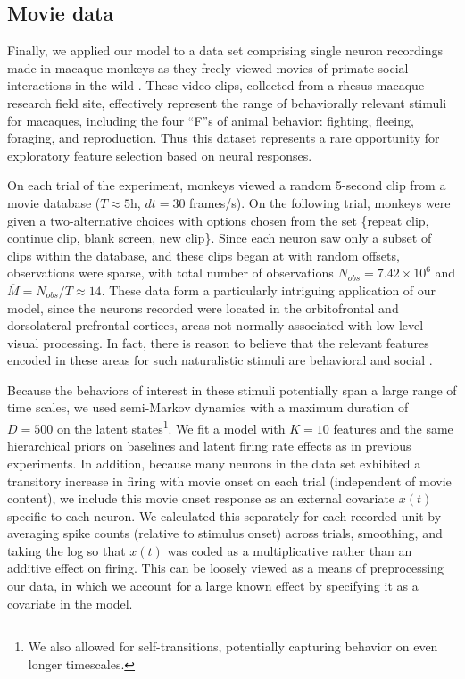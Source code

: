 \documentclass{article} %
\begin{document}
\subsection{Movie data}
Finally, we applied our model to a data set comprising single neuron recordings made in macaque monkeys as they freely viewed movies of primate social interactions in the wild%
 . These video clips, collected from a rhesus macaque research field site, effectively represent the range of behaviorally relevant stimuli for macaques, including the four ``F''s of animal behavior: fighting, fleeing, foraging, and reproduction. Thus this dataset represents a rare opportunity for exploratory feature selection based on neural responses.

On each trial of the experiment, monkeys viewed a random 5-second clip from a movie database ($T \approx 5$h, $dt = 30$ frames/s). On the following trial, monkeys were given a two-alternative choices with options chosen from the set \{repeat clip, continue clip, blank screen, new clip\}. Since each neuron saw only a subset of clips within the database, and these clips began at with random offsets, observations were sparse, with total number of observations $N_{obs} = 7.42 \times 10^6$ and $\overline{M} = N_{obs}/T \approx 14$. These data form a particularly intriguing application of our model, since the neurons recorded were located in the orbitofrontal and dorsolateral prefrontal cortices, areas not normally associated with low-level visual processing. In fact, there is reason to believe that the relevant features encoded in these areas for such naturalistic stimuli are behavioral and social \cite{watson2012social}.

Because the behaviors of interest in these stimuli potentially span a large range of time scales, we used semi-Markov dynamics with a maximum duration of $D = 500$ on the latent states\footnote{We also allowed for self-transitions, potentially capturing behavior on even longer timescales.}. We fit a model with $K=10$ features and the same hierarchical priors on baselines and latent firing rate effects as in previous experiments. In addition, because many neurons in the data set exhibited a transitory increase in firing with movie onset on each trial (independent of movie content), we include this movie onset response as an external covariate $x(t)$ specific to each neuron. We calculated this separately for each recorded unit by averaging spike counts (relative to stimulus onset) across trials, smoothing, and taking the log so that $x(t)$ was coded as a multiplicative rather than an additive effect on firing. This can be loosely viewed as a means of preprocessing our data, in which we account for a large known effect by specifying it as a covariate in the model.
\end{document}
